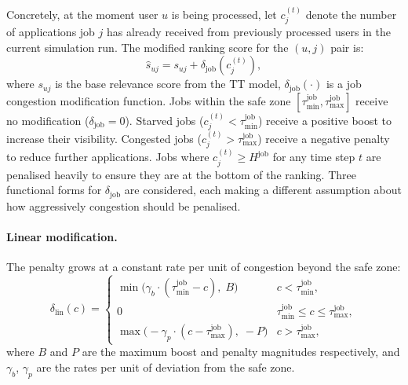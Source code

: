 Concretely, at the moment user $u$ is being processed, let $c_j^{(t)}$ denote the number of applications job $j$ has already received from previously processed users in the current simulation run. The modified ranking score for the $(u,j)$ pair is:
\begin{equation}
    \hat{s}_{uj} = s_{uj} + \delta_{\text{job}}\!\left(c_j^{(t)}\right),
\end{equation}
where $s_{uj}$ is the base relevance score from the \gls{TT} model,
$\delta_{\text{job}}(\cdot)$ is a job congestion modification function. Jobs within the safe zone $[\tau_{\min}^{\text{job}}, \tau_{\max}^{\text{job}}]$ receive no
modification ($\delta_{\text{job}} = 0$). Starved jobs ($c_j^{(t)} < \tau_{\min}^{\text{job}}$) receive a positive boost to increase their visibility. Congested jobs ($c_j^{(t)} > \tau_{\max}^{\text{job}}$) receive a negative penalty to reduce
further applications. Jobs where $c_j^{(t)} \geq H^{\text{job}}$ for any time step $t$ are penalised heavily to ensure they are at the bottom of the ranking. Three functional forms for $\delta_{\text{job}}$ are considered, each making a different assumption about how aggressively congestion should be
penalised.

\paragraph{Linear modification.}
The penalty grows at a constant rate per unit of congestion beyond the safe
zone:
\begin{equation}
    \delta_{\text{lin}}(c) = \begin{cases}
        \min\!\bigl(\gamma_b \cdot (\tau_{\min}^{\text{job}} - c),\; B\bigr) & c < \tau_{\min}^{\text{job}}, \\
        0 & \tau_{\min}^{\text{job}} \leq c \leq \tau_{\max}^{\text{job}}, \\
        \max\!\bigl(-\gamma_p \cdot (c - \tau_{\max}^{\text{job}}),\; -P\bigr) & c > \tau_{\max}^{\text{job}},
    \end{cases}
\end{equation}
where $B$ and $P$ are the maximum boost and penalty magnitudes respectively,
and $\gamma_b$, $\gamma_p$ are the rates per unit of deviation from the safe
zone.

